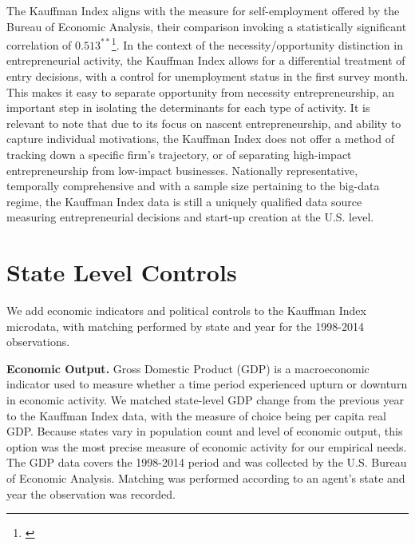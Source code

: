 The Kauffman Index aligns with the measure for self-employment offered by the Bureau of Economic Analysis, their comparison invoking a statistically significant correlation of $0.513^{**}$\footnote{\cite{Goetz2008}}. In the context of the necessity/opportunity distinction in entrepreneurial activity, the Kauffman Index allows for a differential treatment of entry decisions, with a control for unemployment status in the first survey month. This makes it easy to separate opportunity from necessity entrepreneurship, an important step in isolating the determinants for each type of activity. It is relevant to note that due to its focus on nascent entrepreneurship, and ability to capture individual motivations, the Kauffman Index does not offer a method of tracking down a specific firm's trajectory, or of separating high-impact entrepreneurship from low-impact businesses. Nationally representative, temporally comprehensive and with a sample size pertaining to the big-data regime, the Kauffman Index data is still a uniquely qualified data source measuring entrepreneurial decisions and start-up creation at the U.S. level. 

\section{State Level Controls}
We add economic indicators and political controls to the Kauffman Index microdata, with matching performed by state and year for the 1998-2014 observations. 

\textbf{Economic Output.} Gross Domestic Product (GDP) is a macroeconomic indicator used to measure whether a time period experienced upturn or downturn in economic activity. We matched state-level GDP change from the previous year to the Kauffman Index data, with the measure of choice being per capita real GDP. Because states vary in population count and level of economic output, this option was the most precise measure of economic activity for our empirical needs. The GDP data covers the 1998-2014 period and was collected by the U.S. Bureau of Economic Analysis. Matching was performed according to an agent's state and year the observation was recorded.  

